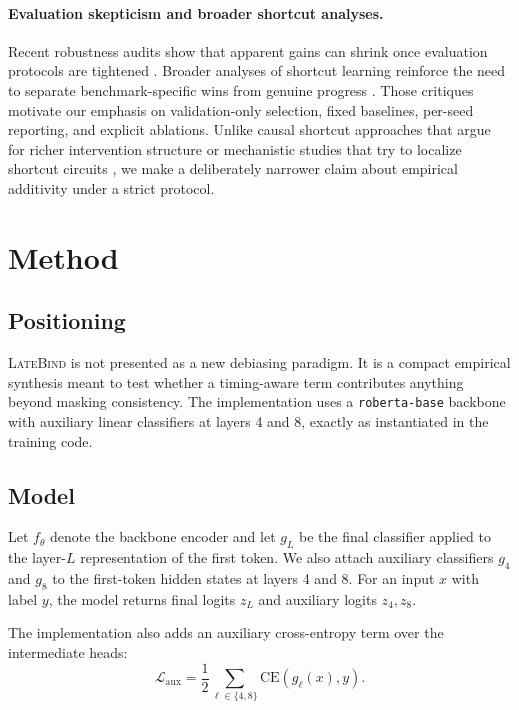 \documentclass{article}
\newcommand{\LateBind}{\textsc{LateBind}}
\begin{document}
\paragraph{Evaluation skepticism and broader shortcut analyses.}
Recent robustness audits show that apparent gains can shrink once evaluation protocols are tightened \citep{gupta-etal-2024-whispers,calderon-etal-2024-measuring}. Broader analyses of shortcut learning reinforce the need to separate benchmark-specific wins from genuine progress \citep{zhou-etal-2024-navigating}. Those critiques motivate our emphasis on validation-only selection, fixed baselines, per-seed reporting, and explicit ablations. Unlike causal shortcut approaches that argue for richer intervention structure \citep{zhou-zhu-2025-fighting} or mechanistic studies that try to localize shortcut circuits \citep{eshuijs-etal-2025-short-circuiting}, we make a deliberately narrower claim about empirical additivity under a strict protocol.

\section{Method}
\label{sec:method}

\subsection{Positioning}

\LateBind{} is not presented as a new debiasing paradigm. It is a compact empirical synthesis meant to test whether a timing-aware term contributes anything beyond masking consistency. The implementation uses a \texttt{roberta-base} backbone with auxiliary linear classifiers at layers 4 and 8, exactly as instantiated in the training code.

\subsection{Model}

Let $f_\theta$ denote the backbone encoder and let $g_L$ be the final classifier applied to the layer-$L$ representation of the first token. We also attach auxiliary classifiers $g_4$ and $g_8$ to the first-token hidden states at layers 4 and 8. For an input $x$ with label $y$, the model returns final logits $z_L$ and auxiliary logits $z_4, z_8$.

The implementation also adds an auxiliary cross-entropy term over the intermediate heads:
\begin{equation}
\mathcal{L}_{\mathrm{aux}} = \frac{1}{2}\sum_{\ell \in \{4,8\}} \mathrm{CE}(g_\ell(x), y).
\end{equation}
\end{document}
